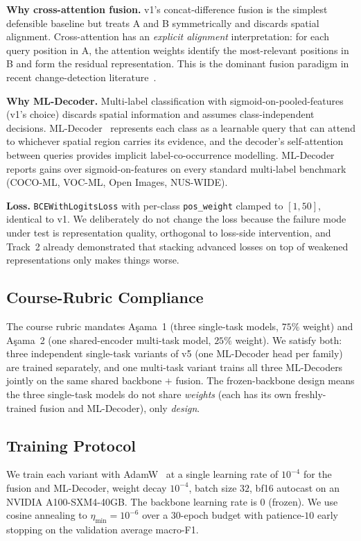 \documentclass[journal]{IEEEtran}
\begin{document}
\textbf{Why cross-attention fusion.} v1's concat-difference fusion is the simplest defensible baseline but treats A and B symmetrically and discards spatial alignment. Cross-attention has an \emph{explicit alignment} interpretation: for each query position in A, the attention weights identify the most-relevant positions in B and form the residual representation. This is the dominant fusion paradigm in recent change-detection literature~\cite{wu2023cstsunet,xie2025mifnet,xu2022scad}.

\textbf{Why ML-Decoder.} Multi-label classification with sigmoid-on-pooled-features (v1's choice) discards spatial information and assumes class-independent decisions. ML-Decoder~\cite{ridnik2023mldecoder} represents each class as a learnable query that can attend to whichever spatial region carries its evidence, and the decoder's self-attention between queries provides implicit label-co-occurrence modelling. ML-Decoder reports gains over sigmoid-on-features on every standard multi-label benchmark (COCO-ML, VOC-ML, Open Images, NUS-WIDE).

\textbf{Loss.} \texttt{BCEWithLogitsLoss} with per-class \texttt{pos\_weight} clamped to $[1,50]$, identical to v1. We deliberately do not change the loss because the failure mode under test is representation quality, orthogonal to loss-side intervention, and Track~2 already demonstrated that stacking advanced losses on top of weakened representations only makes things worse.

\subsection{Course-Rubric Compliance}\label{ssec:rubric}
The course rubric mandates A\c{s}ama~1 (three single-task models, $75\%$ weight) and A\c{s}ama~2 (one shared-encoder multi-task model, $25\%$ weight). We satisfy both: three independent single-task variants of v5 (one ML-Decoder head per family) are trained separately, and one multi-task variant trains all three ML-Decoders jointly on the same shared backbone $+$ fusion. The frozen-backbone design means the three single-task models do not share \emph{weights} (each has its own freshly-trained fusion and ML-Decoder), only \emph{design}.

\subsection{Training Protocol}\label{ssec:training}
We train each variant with AdamW~\cite{loshchilov2019adamw} at a single learning rate of $10^{-4}$ for the fusion and ML-Decoder, weight decay $10^{-4}$, batch size $32$, bf16 autocast on an NVIDIA A100-SXM4-40GB. The backbone learning rate is $0$ (frozen). We use cosine annealing to $\eta_\mathrm{min}{=}10^{-6}$ over a $30$-epoch budget with patience-$10$ early stopping on the validation average macro-F1.
\end{document}
